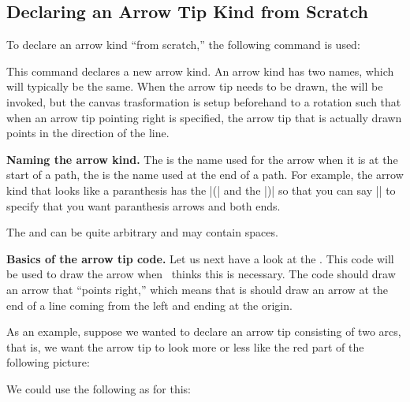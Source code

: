 \subsection{Declaring an Arrow Tip Kind from Scratch}

To declare an arrow kind ``from scratch,'' the following command is
used:

\begin{command}{\pgfarrowsdeclare{}}
  This command declares a new arrow kind. An arrow kind has two names,
  which will typically be the same. When the arrow tip needs to be
  drawn, the  will be invoked, but the canvas
  trasformation is setup beforehand to a rotation such that when an
  arrow tip pointing right is specified, the arrow tip that is
  actually drawn points in the direction of the line.

  \medskip
  \textbf{Naming the arrow kind.}
  The  is the name
  used for the arrow when it is at the start of a path, the  is the name used at the end of a path. For example, the
  arrow kind that looks like a paranthesis has the  |(| and the  |)| so that you can say
  |\pgfsetarrows{(-)}| to specify that you want paranthesis arrows and
  both ends.

  The  and  can be quite arbitrary and
  may contain spaces.

  \medskip
  \textbf{Basics of the arrow tip code.}
  Let us next have a look at the . This code will
  be used to draw the arrow when \pgfname\ thinks this is
  necessary. The code should draw an arrow that ``points right,''
  which means that is should draw an arrow at the end of a line coming
  from the left and ending at the origin.

  As an example, suppose we wanted to declare an arrow tip consisting
  of two arcs, that is, we want the arrow tip to look more or less
  like the red part of the following picture:
\begin{codeexample}[]
\end{codeexample}

  We could use the following as  for this:
\begin{codeexample}
{
  \pgfsetdash{}{0pt} %
  \pgfsetroundjoin   %
  \pgfsetroundcap    %
  \pgfpathmoveto{\pgfpoint{-10pt}{10pt}}
  \pgfusepathqstroke
}
\end{codeexample}


\end{command}
